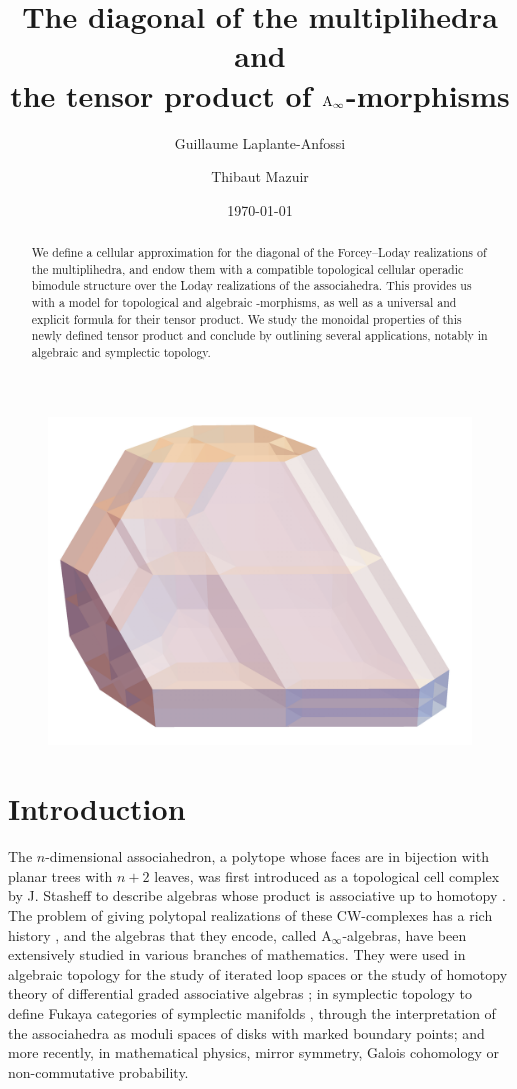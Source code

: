 \documentclass[10pt]{amsart}
\title[The diagonal of the multiplihedra]{The diagonal of the multiplihedra and \\ the tensor product of $\mathrm{A}_\infty$-morphisms}
\author{Guillaume Laplante-Anfossi}
\author{Thibaut Mazuir}
\date{\today}
\theoremstyle{remark}
\begin{document}
\begin{abstract}
We define a cellular approximation for the diagonal of the Forcey--Loday realizations of the multiplihedra, and endow them with a compatible topological cellular operadic bimodule structure over the Loday realizations of the associahedra. 
This provides us with a model for topological and algebraic \Ainf -morphisms, as well as a universal and explicit formula for their tensor product.
We study the monoidal properties of this newly defined tensor product and conclude by outlining several applications, notably in algebraic and symplectic topology.
\end{abstract}

\maketitle

\begin{figure}[h!]
\centering
\includegraphics[width=0.6\linewidth]{J4.png} 
\label{Fig5:J4}
\end{figure}

\newpage

\setcounter{tocdepth}{1}
\tableofcontents


\section*{Introduction}

The $n$-dimensional associahedron, a polytope whose faces are in bijection with planar trees with $n+2$ leaves, was first introduced as a topological cell complex by J. Stasheff to describe algebras whose product is associative up to homotopy \cite{Stasheff63}.
The problem of giving polytopal realizations of these CW-complexes has a rich history \cite{CeballosZiegler12}, and the algebras that they encode, called $\mathrm{A}_\infty$-algebras, have been extensively studied in various branches of mathematics. They were used in algebraic topology for the study of iterated loop spaces \cite{May72,BoardmanVogt73} or the study of homotopy theory of differential graded associative algebras \cite{LefevreHasegawa03,Vallette14} ; in symplectic topology to define Fukaya categories of symplectic manifolds \cite{Seidel08,fo3-I,fo3-II}, through the interpretation of the associahedra as moduli spaces of disks with marked boundary points; and more recently, in mathematical physics, mirror symmetry, Galois cohomology or non-commutative probability.
\end{document}
